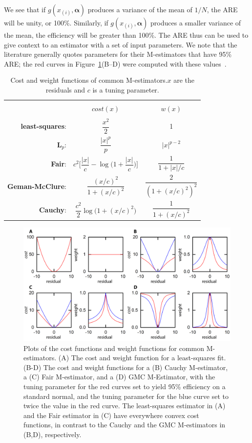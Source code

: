 We see that if $g(x_{(i)},\bm{\alpha})$ produces a variance of the mean of $1/N$, the ARE will be unity, or 100\%.
Similarly, if $g(x_{(i)},\bm{\alpha})$ produces a smaller variance of the mean, the efficiency will be greater than 100\%.
The ARE thus can be used to give context to an estimator with a set of input parameters.
We note that the literature generally quotes parameters for their M-estimators that have 95\% ARE; the red curves in Figure~\ref{f:3-CostFxn}(B--D) were computed with these values~\cite{RN318,RN32,RN52}.
\newpage
\begin{table}[ht]
  \centering
  \caption{Cost and weight functions of common M-estimators.\@ $x$ are the residuals and $c$ is a tuning parameter.}
  \begin{tabular}{|r c c |}
    \hline \\[-0.45cm]
     & $\mathit{cost}(x)$ & $w(x)$\\
    \hline \\[-0.3cm]
    {\bf least-squares}:& $\dfrac{x^2}{2}$ & 1\\ [0.5cm]
    {\bf L$_p$}:& $ \dfrac{|x|^p}{p} $ & $|x|^{p-2}$\\[0.5cm]
    {\bf Fair}:& $c^2 \Bigg [ \dfrac{|x|}{c} - \log \Big ( 1 + \dfrac{|x|}{c}\Big ) \Bigg ]$ & $\dfrac{1}{1 + |x|/c}$ \\ [0.5cm]
    {\bf Geman-McClure}:& $\dfrac{(x/c)^2}{1+(x/c)^2}$ & $\dfrac{2}{(1+(x/c)^2)^2}$ \\ [0.5cm]
    {\bf Cauchy}:& $\dfrac{c^2}{2} \log \big ( 1 + (x/c)^2 \big)$ & $\dfrac{1}{1 + (x/c)^2}$\\ [0.5cm]
    \hline
  \end{tabular}\label{t:3-CostFxn}
\end{table}

\begin{figure}[H]
  \centering
  \includegraphics{figures/C3/Ch3-Figs_IRLSfxn.png}
  \caption{Plots of the cost functions and weight functions for common M-estimators.
  (A) The cost and weight function for a least-squares fit.
  (B-D) The cost and weight functions for a (B) Cauchy M-estimator, a (C) Fair M-estimator, and a (D) GMC M-Estimator, with the tuning parameter for the red curves set to yield 95\% efficiency on a standard normal, and the tuning parameter for the blue curve set to twice the value in the red curve.
  The least-squares estimator in (A) and the Fair estimator in (C) have everywhere convex cost functions, in contrast to the Cauchy and the GMC M-estimators in (B,D), respectively.}\label{f:3-CostFxn}
\end{figure}
\newpage
